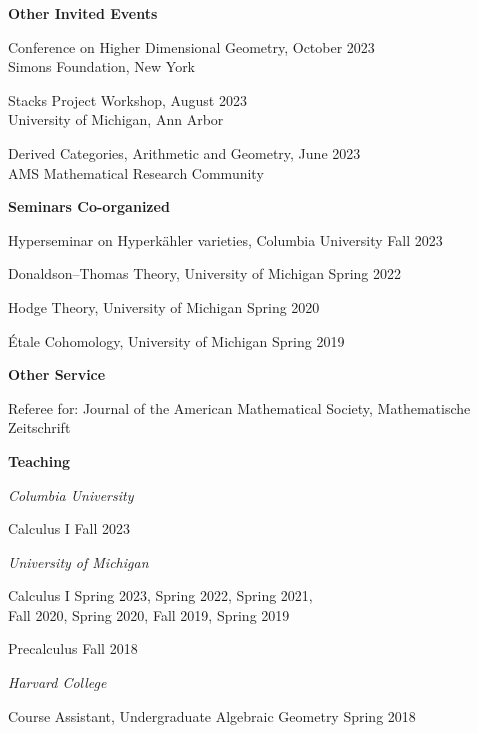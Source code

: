 \documentclass[11 pt]{letter}
\begin{document}
	\medskip
	\noindent
	\textbf{Other Invited Events}

	Conference on Higher Dimensional Geometry, \hfill October 2023 \\
	\indent Simons Foundation, New York

	Stacks Project Workshop, \hfill August 2023 \\
	\indent University of Michigan, Ann Arbor 

	Derived Categories, Arithmetic and Geometry, \hfill June 2023 \\
	\indent AMS Mathematical Research Community 


	
	\medskip
	\noindent
	\textbf{\large{Seminars Co-organized}}

	Hyperseminar on Hyperk\"ahler varieties, Columbia University \hfill Fall 2023

	Donaldson--Thomas Theory, University of Michigan \hfill Spring 2022

	Hodge Theory, University of Michigan \hfill Spring 2020

	\'Etale Cohomology, University of Michigan \hfill Spring 2019 

	

	\medskip
	\noindent
	\textbf{Other Service}

	Referee for: Journal of the American Mathematical Society, Mathematische Zeitschrift


	\medskip
	\noindent
	\textbf{\large{Teaching}}

	\noindent \emph{Columbia University}

	Calculus I \hfill Fall 2023


	\noindent \emph{University of Michigan}


	

	Calculus I \hfill Spring 2023, Spring 2022, Spring 2021, \\ 
	\null \hfill Fall 2020, Spring 2020, Fall 2019, Spring 2019



	Precalculus \hfill Fall 2018 


	\noindent \emph{Harvard College}

	Course Assistant, Undergraduate Algebraic Geometry \hfill Spring 2018



	









	

\end{document}
